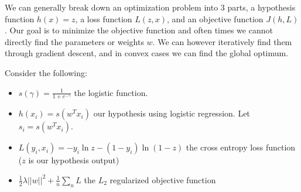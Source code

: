 
We can generally break down an optimization problem into 3 parts, a hypothesis function $h(x) = z$, a loss function $L(z, x)$, and an objective function $J(h, L)$. Our goal is to minimize the objective function and often times we cannot directly find the parameters or weights $w$. We can however iteratively find them through gradient descent, and in convex cases we can find the global optimum.

Consider the following:
\begin{itemize}
    \item $s(\gamma) = \frac{1}{1+e^{-\gamma}}$ the logistic function.
    \item $h(x_i) = s(w^Tx_i)$ our hypothesis using logistic regression. Let $s_i = s(w^Tx_i)$.
    \item $L(y_i, x_i) = - y_i\ln z - (1-y_i)\ln(1-z)$ the cross entropy loss function ($z$ is our hypothesis output)
    \item $\frac{1}{2}\lambda||w||^2 + \frac{1}{n}\sum_nL$ the $L_2$ regularized objective function
\end{itemize}

